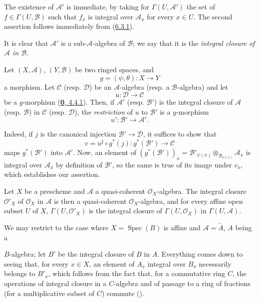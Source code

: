 The existence of $\mathcal{A}'$ is immediate, by taking for
$\Gamma(U,\mathcal{A}')$ the set of $f\in\Gamma(U,\mathcal{B})$ such that
$f_x$ is integral over $\mathcal{A}_x$ for every $x\in U$. The second
assertion follows immediately from (\hyperref[II.6.3.1]{6.3.1}).

It is clear that $\mathcal{A}'$ is a sub-$\mathcal{A}$-algebra of
$\mathcal{B}$; we say that it is the \emph{integral closure of
$\mathcal{A}$ in $\mathcal{B}$}.

\begin{env}[6.3.3]
\label{II.6.3.3}
Let $(X,\mathcal{A})$, $(Y,\mathcal{B})$ be two ringed spaces, and
\[
g=(\psi,\theta):X\to Y
\]
a morphism. Let $\mathcal{C}$ (resp. $\mathcal{D}$) be an
$\mathcal{A}$-algebra (resp. a $\mathcal{B}$-algebra) and let
\[
u:\mathcal{D}\to\mathcal{C}
\]
be a $g$-morphism (\hyperref[0.4.4.1]{\textbf{0}, 4.4.1}). Then, if
$\mathcal{A}'$ (resp. $\mathcal{B}'$) is the integral closure of
$\mathcal{A}$ (resp. $\mathcal{B}$) in $\mathcal{C}$ (resp.
$\mathcal{D}$), the \emph{restriction} of $u$ to $\mathcal{B}'$ is a
$g$-morphism
\[
u':\mathcal{B}'\to\mathcal{A}'.
\]

Indeed, if $j$ is the canonical injection $\mathcal{B}'\to\mathcal{D}$, it
suffices to show that
\[
v=u^\sharp\circ g^*(j):g^*(\mathcal{B}')\to\mathcal{C}
\]
maps $g^*(\mathcal{B}')$ into $\mathcal{A}'$. Now, an element of
$(g^*(\mathcal{B}'))_x=\mathcal{B}'_{\psi(x)}\otimes_{\mathcal{B}_{\psi(x)}}
\mathcal{A}_x$ is integral over $\mathcal{A}_x$ by definition of
$\mathcal{B}'$, so the same is true of its image under $v_x$, which
establishes our assertion.
\end{env}

\begin{proposition}[6.3.4]
\label{II.6.3.4}
Let $X$ be a prescheme and $\mathcal{A}$ a quasi-coherent
$\mathcal{O}_X$-algebra. The integral closure $\mathcal{O}'_X$ of
$\mathcal{O}_X$ in $\mathcal{A}$ is then a quasi-coherent
$\mathcal{O}_X$-algebra, and for every affine open subset $U$ of $X$,
$\Gamma(U,\mathcal{O}'_X)$ is the integral closure of
$\Gamma(U,\mathcal{O}_X)$ in $\Gamma(U,\mathcal{A})$.
\end{proposition}

We may restrict to the case where $X=\operatorname{Spec}(B)$ is affine and
$\mathcal{A}=\widetilde{A}$, $A$ being a


$B$-algebra; let $B'$ be the integral closure of $B$ in $A$. Everything comes
down to seeing that, for every $x\in X$, an element of $A_x$ integral over
$B_x$ necessarily belongs to $B'_x$, which follows from the fact that, for a
commutative ring $C$, the operations of integral closure in a $C$-algebra and
of passage to a ring of fractions (for a multiplicative subset of $C$)
commute (\cite[vol.~I, pp.~261 and 257]{I-13}).

